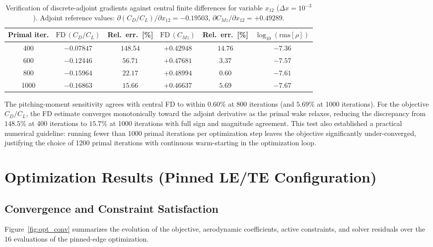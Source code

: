 \documentclass[11pt,a4paper]{article}
\begin{document}
\begin{table}[H]
\centering
\caption{Verification of discrete-adjoint gradients against central finite differences for variable $x_{12}$ ($\Delta x = 10^{-3}$). Adjoint reference values: $\partial(C_D/C_L)/\partial x_{12} = -0.19503$, $\partial C_{Mz}/\partial x_{12} = +0.49289$.}
\label{tab:fd_check}
\begin{tabular}{cccccc}
\toprule
Primal iter. & $\mathrm{FD}\,(C_D/C_L)$ & Rel.\ err.\ [\%] & $\mathrm{FD}\,(C_{Mz})$ & Rel.\ err.\ [\%] & $\log_{10}(\mathrm{rms}[\rho])$ \\
\midrule
400  & $-0.07847$ & $148.54$ & $+0.42948$ & $14.76$ & $-7.36$ \\
600  & $-0.12446$ & $56.71$  & $+0.47681$ & $3.37$  & $-7.57$ \\
800  & $-0.15964$ & $22.17$  & $+0.48994$ & $0.60$  & $-7.61$ \\
1000 & $-0.16863$ & $15.66$  & $+0.46637$ & $5.69$  & $-7.67$ \\
\bottomrule
\end{tabular}
\end{table}

The pitching-moment sensitivity agrees with central FD to within $0.60\%$ at 800 iterations (and $5.69\%$ at 1000 iterations). For the objective $C_D/C_L$, the FD estimate converges monotonically toward the adjoint derivative as the primal wake relaxes, reducing the discrepancy from $148.5\%$ at 400 iterations to $15.7\%$ at 1000 iterations with full sign and magnitude agreement. This test also established a practical numerical guideline: running fewer than 1000 primal iterations per optimization step leaves the objective significantly under-converged, justifying the choice of 1200 primal iterations with continuous warm-starting in the optimization loop.

\section{Optimization Results (Pinned LE/TE Configuration)}

\subsection{Convergence and Constraint Satisfaction}

Figure~\ref{fig:opt_conv} summarizes the evolution of the objective, aerodynamic coefficients, active constraints, and solver residuals over the 16 evaluations of the pinned-edge optimization.
\end{document}
